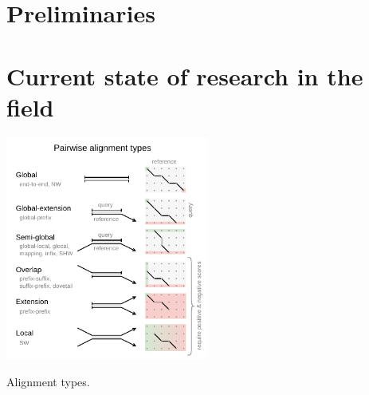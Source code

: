 \label{ch:introduction}


\section{Preliminaries}

\section{Current state of research in the field}

\begin{floatingfigure}[l]{0.5\textwidth}
    \includegraphics[width=0.5\textwidth]{alignment-types}
	\caption[Alignment types]{Alignment types.}
    \label{fig:alignment-types}
\end{floatingfigure}

